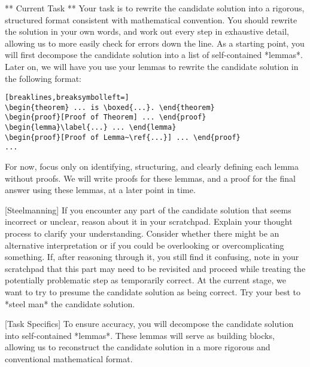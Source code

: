 \begin{tcolorbox}[title=Verification Prompt 1,breakable]
** Current Task **
Your task is to rewrite the candidate solution into a rigorous, structured format consistent with mathematical convention. You should rewrite the solution in your own words, and work out every step in exhaustive detail, allowing us to more easily check for errors down the line. As a starting point, you will first decompose the candidate solution into a list of self-contained *lemmas*. Later on, we will have you use your lemmas to rewrite the candidate solution in the following format:
\begin{Verbatim}[breaklines,breaksymbolleft=]
\begin{theorem} ... is \boxed{...}. \end{theorem}
\begin{proof}[Proof of Theorem] ... \end{proof}
\begin{lemma}\label{...} ... \end{lemma}
\begin{proof}[Proof of Lemma~\ref{...}] ... \end{proof}
...
\end{Verbatim}

For now, focus only on identifying, structuring, and clearly defining each lemma without proofs. We will write proofs for these lemmas, and a proof for the final answer using these lemmas, at a later point in time.

[Steelmanning]
If you encounter any part of the candidate solution that seems incorrect or unclear, reason about it in your scratchpad. Explain your thought process to clarify your understanding. Consider whether there might be an alternative interpretation or if you could be overlooking or overcomplicating something. If, after reasoning through it, you still find it confusing, note in your scratchpad that this part may need to be revisited and proceed while treating the potentially problematic step as temporarily correct. At the current stage, we want to try to presume the candidate solution as being correct. Try your best to *steel man* the candidate solution.

[Task Specifics]
To ensure accuracy, you will decompose the candidate solution into self-contained *lemmas*. These lemmas will serve as building blocks, allowing us to reconstruct the candidate solution in a more rigorous and conventional mathematical format. 


\end{tcolorbox}
